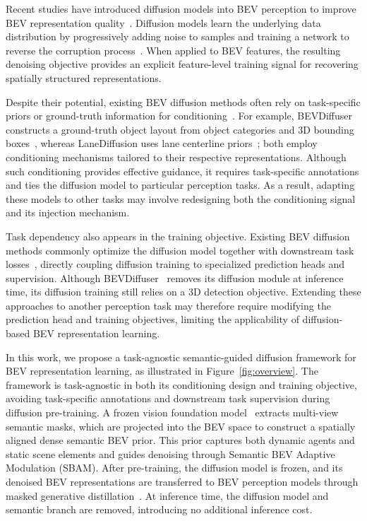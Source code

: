 \documentclass{article} %
\begin{document}
Recent studies have introduced diffusion models into BEV perception to improve
BEV representation quality~\citep{DiffBEV,DifFUSER,BEVDiff}. Diffusion models
learn the underlying data distribution by progressively adding noise to samples
and training a network to reverse the corruption process~\citep{DDPM,DDIM}.
When applied to BEV features, the resulting denoising objective provides an
explicit feature-level training signal for recovering spatially structured
representations.

Despite their potential, existing BEV diffusion methods often rely on
task-specific priors or ground-truth information for
conditioning~\citep{BEVDiff,LaneDiff}. For example, BEVDiffuser constructs a
ground-truth object layout from object categories and 3D bounding
boxes~\citep{BEVDiff}, whereas LaneDiffusion uses lane centerline
priors~\citep{LaneDiff}; both employ conditioning mechanisms tailored to their
respective representations. Although such conditioning provides effective
guidance, it requires task-specific annotations and ties the diffusion model to
particular perception tasks. As a result, adapting these models to other tasks
may involve redesigning both the conditioning signal and its injection
mechanism.

Task dependency also appears in the training objective. Existing BEV diffusion
methods commonly optimize the diffusion model together with downstream task
losses~\citep{BEVDiff,DiffBEV,DifFUSER,DiffVecMap}, directly coupling diffusion
training to specialized prediction heads and supervision. Although
BEVDiffuser~\citep{BEVDiff} removes its diffusion module at inference time, its
diffusion training still relies on a 3D detection objective. Extending these
approaches to another perception task may therefore require modifying the
prediction head and training objectives, limiting the applicability of
diffusion-based BEV representation learning.

In this work, we propose a task-agnostic semantic-guided diffusion framework for
BEV representation learning, as illustrated in Figure~\ref{fig:overview}. The
framework is task-agnostic in both its conditioning design and training
objective, avoiding task-specific annotations and downstream task supervision
during diffusion pre-training. A frozen vision foundation model~\citep{SAM3}
extracts multi-view semantic masks, which are projected into the BEV space to
construct a spatially aligned dense semantic BEV prior. This prior captures both
dynamic agents and static scene elements and guides denoising through Semantic
BEV Adaptive Modulation (SBAM). After pre-training, the diffusion model is
frozen, and its denoised BEV representations are transferred to BEV perception
models through masked generative distillation~\citep{MGD}. At inference time,
the diffusion model and semantic branch are removed, introducing no additional
inference cost.
\end{document}

